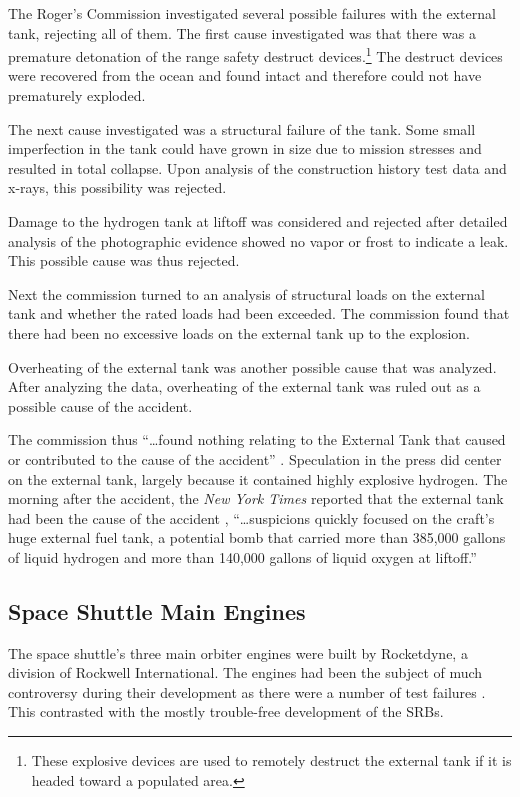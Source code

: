 The Roger's Commission investigated several possible failures with the external tank, rejecting all of them. The first cause investigated was that there was a premature detonation of the range safety destruct devices.\footnote{These explosive devices are used to remotely destruct the external tank if it is headed toward a populated area.} The destruct devices were recovered from the ocean and found intact and therefore could not have prematurely exploded.

The next cause investigated was a structural failure of the tank. Some small imperfection in the tank could have grown in size due to mission stresses and resulted in total collapse. Upon analysis of the construction history test data and x-rays, this possibility was rejected.

Damage to the hydrogen tank at liftoff was considered and rejected after detailed analysis of the photographic evidence showed no vapor or frost to indicate a leak. This possible cause was thus rejected.

Next the commission turned to an analysis of structural loads on the external tank and whether the rated loads had been exceeded. The commission found that there had been no excessive loads on the external tank up to the explosion.

Overheating of the external tank was another possible cause that was analyzed. After analyzing the data, overheating of the external tank was ruled out as a possible cause of the accident.

The commission thus ``\ldots found nothing relating to the External Tank that caused or contributed to the cause of the accident'' \cite[vol. 1, p. 42]{rogers}. Speculation in the press did center on the external tank, largely because it contained highly explosive hydrogen. The morning after the accident, the {\em New York Times} reported that the external tank had been the cause of the accident \cite[p. A1]{nytexternal}, ``\ldots suspicions quickly focused on the craft's huge external fuel tank, a potential bomb that carried more than 385,000 gallons of liquid hydrogen and more than 140,000 gallons of liquid oxygen at liftoff.''

\subsection{Space Shuttle Main Engines}

The space shuttle's three main orbiter engines were built by Rocketdyne, a division of Rockwell International. The engines had been the subject of much controversy during their development as there were a number of test failures \cite{lewis}. This contrasted with the mostly trouble-free development of the SRBs.

